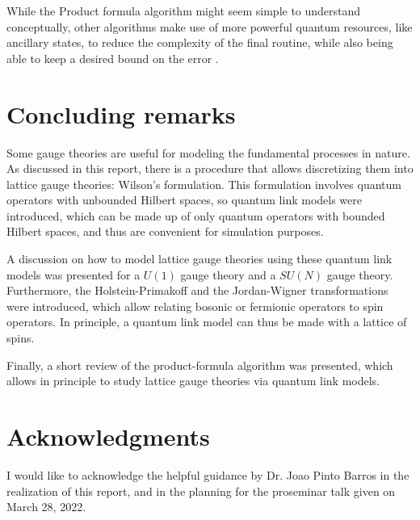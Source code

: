 \documentclass[a4paper]{report}
\begin{document}
\begin{spacing}{1.1}
While the Product formula algorithm might seem simple to understand conceptually, other algorithms make use of more powerful quantum resources, like ancillary states, to reduce the complexity of the final routine, while also being able to keep a desired bound on the error \cite{childs2018toward}.



\section{Concluding remarks}

Some gauge theories are useful for modeling the fundamental processes in nature. As discussed in this report, there is a procedure that allows discretizing them into lattice gauge theories: Wilson’s formulation. This formulation involves quantum operators with unbounded Hilbert spaces, so quantum link models were introduced, which can be made up of only quantum operators with bounded Hilbert spaces, and thus are convenient for simulation purposes.

A discussion on how to model lattice gauge theories using these quantum link models was presented for a $U(1)$ gauge theory and a $SU(N)$ gauge theory. Furthermore, the Holstein-Primakoff and the Jordan-Wigner transformations were introduced, which allow relating bosonic or fermionic operators to spin operators. In principle, a quantum link model can thus be made with a lattice of spins.

Finally, a short review of the product-formula algorithm was presented, which allows in principle to study lattice gauge theories via quantum link models.




\section{Acknowledgments}
I would like to acknowledge the helpful guidance by Dr. Joao Pinto Barros in the realization of this report, and in the planning for the proseminar talk given on March 28, 2022.





\end{spacing}
\end{document}
